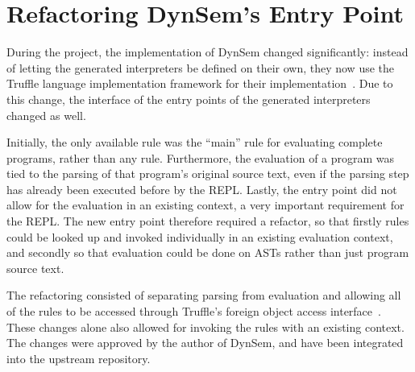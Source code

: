 \section{Refactoring DynSem's Entry Point}
\label{sec:dynsem-refactor}
During the project, the implementation of DynSem changed significantly:
instead of letting the generated interpreters be defined on their own, they now
use the Truffle language implementation framework for their
implementation~\cite{Humer14}. Due to this change, the interface of the entry
points of the generated interpreters changed as well.

Initially, the only available rule was the ``main'' rule for evaluating complete
programs, rather than any rule. Furthermore, the evaluation of a program was
tied to the parsing of that program's original source text, even if the parsing
step has already been executed before by the REPL. Lastly, the entry point did
not allow for the evaluation in an existing context, a very important
requirement for the REPL. The new entry point therefore required a refactor, so
that firstly rules could be looked up and invoked individually in an existing
evaluation context, and secondly so that evaluation could be done on ASTs rather
than just program source text.

The refactoring consisted of separating parsing from evaluation and allowing all
of the rules to be accessed through Truffle's foreign object access
interface~\cite{Grimmer15}. These changes alone also allowed for invoking the
rules with an existing context. The changes were approved by the author of
DynSem, and have been integrated into the upstream repository.

